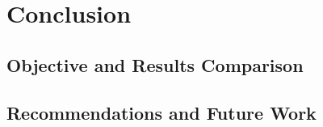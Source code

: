 \chapter{Conclusion} 
\label{Conclusion}










\section{Objective and Results Comparison}

\section{Recommendations and Future Work}
